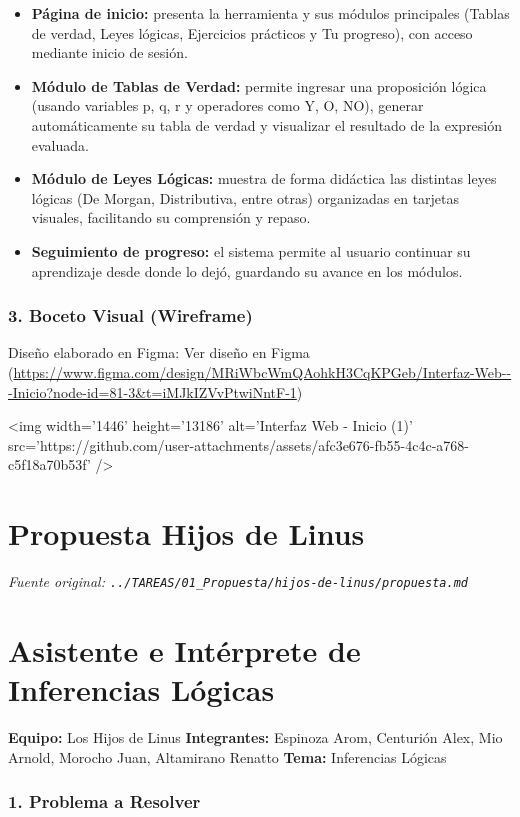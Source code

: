 \documentclass[11pt,a4paper,openany]{book}
\begin{document}
\begin{itemize}[leftmargin=*]
\item \textbf{Página de inicio:} presenta la herramienta y sus módulos principales (Tablas de verdad, Leyes lógicas, Ejercicios prácticos y Tu progreso), con acceso mediante inicio de sesión.
\item \textbf{Módulo de Tablas de Verdad:} permite ingresar una proposición lógica (usando variables p, q, r y operadores como Y, O, NO), generar automáticamente su tabla de verdad y visualizar el resultado de la expresión evaluada.
\item \textbf{Módulo de Leyes Lógicas:} muestra de forma didáctica las distintas leyes lógicas (De Morgan, Distributiva, entre otras) organizadas en tarjetas visuales, facilitando su comprensión y repaso.
\item \textbf{Seguimiento de progreso:} el sistema permite al usuario continuar su aprendizaje desde donde lo dejó, guardando su avance en los módulos.
\end{itemize}

\subsubsection{3. Boceto Visual (Wireframe)}
Diseño elaborado en Figma:
 Ver diseño en Figma (\url{https://www.figma.com/design/MRiWbcWmQAohkH3CqKPGeb/Interfaz-Web---Inicio?node-id=81-3&t=iMJkIZVvPtwiNntF-1})

<img width='1446' height='13186' alt='Interfaz Web - Inicio (1)' src='https://github.com/user-attachments/assets/afc3e676-fb55-4c4c-a768-c5f18a70b53f' />


\section{Propuesta Hijos de Linus}
\textit{Fuente original: \texttt{../TAREAS/01\_Propuesta/hijos-de-linus/propuesta.md}}

\section{Asistente e Intérprete de Inferencias Lógicas}

\textbf{Equipo:} Los Hijos de Linus
\textbf{Integrantes:} Espinoza Arom, Centurión Alex, Mio Arnold, Morocho Juan, Altamirano Renatto
\textbf{Tema:} Inferencias Lógicas

\hrulefill

\subsubsection{1. Problema a Resolver}
\end{document}
